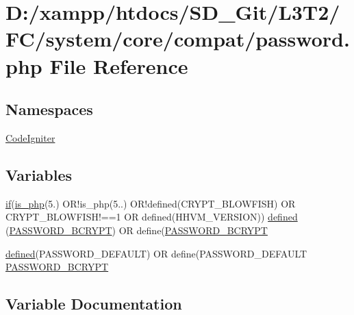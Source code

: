 \hypertarget{password_8php}{}\section{D\+:/xampp/htdocs/\+S\+D\+\_\+\+Git/\+L3\+T2/\+F\+C/system/core/compat/password.php File Reference}
\label{password_8php}
\subsection*{Namespaces}
\begin{DoxyCompactItemize}
\item 
 \hyperlink{namespace_code_igniter}{Code\+Igniter}
\end{DoxyCompactItemize}
\subsection*{Variables}
\begin{DoxyCompactItemize}
\item 
\hyperlink{excanvas_8js_a409038cddd5fb941140f7ff76f5b7b15}{if}(\hyperlink{_bootstrap_8php_acbea7ca989439eea4c6019ad3c5161aa}{is\+\_\+php}(\textquotesingle{}5.\textquotesingle{}) O\+R!is\+\_\+php(\textquotesingle{}5..\textquotesingle{}) O\+R!defined(\textquotesingle{}C\+R\+Y\+P\+T\+\_\+\+B\+L\+O\+W\+F\+I\+S\+H\textquotesingle{}) O\+R C\+R\+Y\+P\+T\+\_\+\+B\+L\+O\+W\+F\+I\+S\+H!==1 O\+R defined(\textquotesingle{}H\+H\+V\+M\+\_\+\+V\+E\+R\+S\+I\+O\+N\textquotesingle{})) \hyperlink{password_8php_aabb8e1f89683202c71f81779040eb22f}{defined} (\textquotesingle{}\hyperlink{password_8php_a71c35e51b9c76d5ecb437d588ab8f046}{P\+A\+S\+S\+W\+O\+R\+D\+\_\+\+B\+C\+R\+Y\+P\+T}\textquotesingle{}) O\+R define(\textquotesingle{}\hyperlink{password_8php_a71c35e51b9c76d5ecb437d588ab8f046}{P\+A\+S\+S\+W\+O\+R\+D\+\_\+\+B\+C\+R\+Y\+P\+T}\textquotesingle{}
\item 
\hyperlink{_bootstrap_8php_a46458e8654a714e0565e20f63021add9}{defined}(\textquotesingle{}P\+A\+S\+S\+W\+O\+R\+D\+\_\+\+D\+E\+F\+A\+U\+L\+T\textquotesingle{}) O\+R define(\textquotesingle{}P\+A\+S\+S\+W\+O\+R\+D\+\_\+\+D\+E\+F\+A\+U\+L\+T\textquotesingle{} \hyperlink{password_8php_a71c35e51b9c76d5ecb437d588ab8f046}{P\+A\+S\+S\+W\+O\+R\+D\+\_\+\+B\+C\+R\+Y\+P\+T}
\end{DoxyCompactItemize}


\subsection{Variable Documentation}
\hypertarget{password_8php_aabb8e1f89683202c71f81779040eb22f}{}
